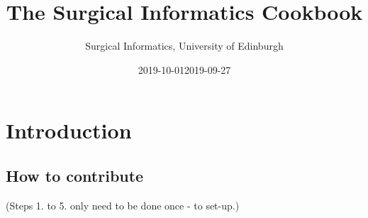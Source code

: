 \documentclass[]{book}
\title{The Surgical Informatics Cookbook}
\author{Surgical Informatics, University of Edinburgh}
\date{2019-10-01}
\date{2019-09-27}
\begin{document}
\maketitle

{
\setcounter{tocdepth}{1}
\tableofcontents
}
\hypertarget{section}{%
\chapter*{}\label{section}}

\hypertarget{intro}{%
\chapter{Introduction}\label{intro}}

\hypertarget{how-to-contribute}{%
\section{How to contribute}\label{how-to-contribute}}

(Steps 1. to 5. only need to be done once - to set-up.)
\end{document}
